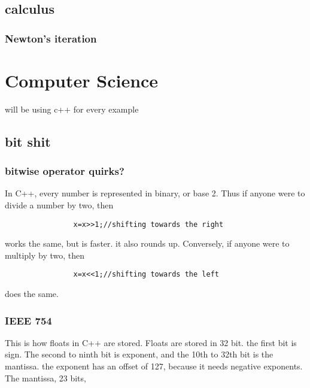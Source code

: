 \documentclass{article} %
\begin{document}
    \subsection{calculus}
        \subsubsection{Newton's iteration}
\section{Computer Science}
will be using c++ for every example
    \subsection{bit shit}
        \subsubsection{bitwise operator quirks?}
            In C++, every number is represented in binary, or base 2. Thus if anyone were to divide a number by two, then
            \begin{verbatim}
                x=x>>1;//shifting towards the right
            \end{verbatim}
            works the same, but is faster. it also rounds up. Conversely, if anyone were to multiply by two, then 
            \begin{verbatim}
                x=x<<1;//shifting towards the left
            \end{verbatim}
            does the same.
        \subsubsection{IEEE 754}
            This is how floats in C++ are stored. Floats are stored in 32 bit. the first bit is sign.
            The second to ninth bit is exponent, and the 10th to 32th bit is the mantissa. the exponent has
            an offset of 127, because it needs negative exponents. The mantissa, 23 bits, 
\end{document}
